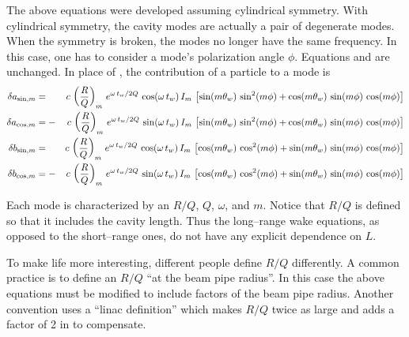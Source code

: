 The above equations were developed assuming cylindrical symmetry. With
cylindrical symmetry, the cavity modes are actually a pair of
degenerate modes. When the symmetry is broken, the modes no longer have the
same frequency. In this case, one has to consider a mode's polarization
angle $\phi$. Equations  and  are unchanged. 
In place of , the contribution of a particle to a mode is
\begin{alignat}{2}
  \delta a_{\sin, m} &=  &c \, \left( \frac{R}{Q} \right)_m \,
    e^{\omega \, t_w/ 2 Q} \, \cos (\omega \, t_w) \, I_m \, \left[
    \sin(m \theta_w) \, \sin^2(m \phi) + 
    \cos(m \theta_w) \, \sin(m \phi) \, \cos(m\phi) \right]
    \nonumber \\
  \delta a_{\cos, m} &= -&c \, \left( \frac{R}{Q} \right)_m \,
    e^{\omega \, t_w/ 2 Q} \, \sin (\omega \, t_w) \, I_m \, \left[ 
    \sin(m \theta_w) \, \sin^2(m \phi) + 
    \cos(m \theta_w) \, \sin(m \phi) \, \cos(m\phi) \right]
    \\
  \delta b_{\sin, m} &=  &c \, \left( \frac{R}{Q} \right)_m \,
    e^{\omega \, t_w/ 2 Q} \, \cos (\omega \, t_w) \, I_m \, \left[
    \cos(m \theta_w) \, \cos^2(m \phi) + 
    \sin(m \theta_w) \, \sin(m \phi) \, \cos(m\phi) \right]
    \nonumber \\
  \delta b_{\cos, m} &= -&c \, \left( \frac{R}{Q} \right)_m \,
    e^{\omega \, t_w/ 2 Q} \, \sin (\omega \, t_w) \, I_m \, \left[
    \cos(m \theta_w) \, \cos^2(m \phi) + 
    \sin(m \theta_w) \, \sin(m \phi) \, \cos(m\phi) \right]
    \nonumber
\end{alignat}

Each mode is characterized by an $R/Q$, $Q$, $\omega$, and $m$. Notice
that $R/Q$ is defined so that it includes the cavity length. Thus the
long--range wake equations, as opposed to the short--range ones, do
not have any explicit dependence on $L$. 

To make life more interesting, different people define $R/Q$
differently. A common practice is to define an $R/Q$ ``at the beam
pipe radius''. In this case the above equations must be modified to
include factors of the beam pipe radius. Another convention uses a
``linac definition'' which makes $R/Q$ twice as large and adds a
factor of 2 in  to compensate.

